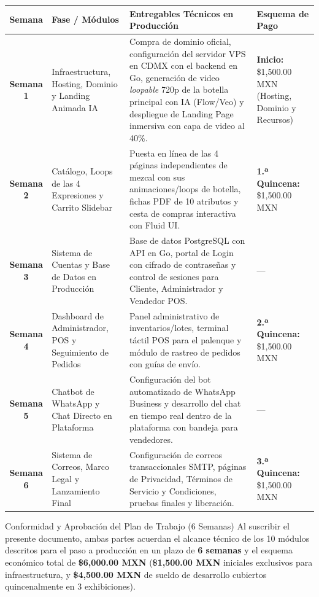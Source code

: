 \documentclass[11pt,letterpaper]{article}
\begin{document}
\begin{table}[H]
\centering
\small
\begin{tabularx}{\textwidth}{cp{4.4cm}Xp{3.0cm}}
\toprule
\rowcolor{MezcalAgave!15}
\textbf{Semana} & \textbf{Fase / Módulos} & \textbf{Entregables Técnicos en Producción} & \textbf{Esquema de Pago} \\
\midrule
\textbf{Semana 1} & Infraestructura, Hosting, Dominio y Landing Animada IA & Compra de dominio oficial, configuración del servidor VPS en CDMX con el backend en Go, generación de video \textit{loopable} 720p de la botella principal con IA (Flow/Veo) y despliegue de Landing Page inmersiva con capa de video al 40\%. & \textbf{Inicio:} \$1,500.00 MXN (Hosting, Dominio y Recursos) \\
\midrule
\textbf{Semana 2} & Catálogo, Loops de las 4 Expresiones y Carrito Slidebar & Puesta en línea de las 4 páginas independientes de mezcal con sus animaciones/loops de botella, fichas PDF de 10 atributos y cesta de compras interactiva con Fluid UI. & \textbf{1.ª Quincena:} \$1,500.00 MXN \\
\midrule
\textbf{Semana 3} & Sistema de Cuentas y Base de Datos en Producción & Base de datos PostgreSQL con API en Go, portal de Login con cifrado de contraseñas y control de sesiones para Cliente, Administrador y Vendedor POS. & --- \\
\midrule
\textbf{Semana 4} & Dashboard de Administrador, POS y Seguimiento de Pedidos & Panel administrativo de inventarios/lotes, terminal táctil POS para el palenque y módulo de rastreo de pedidos con guías de envío. & \textbf{2.ª Quincena:} \$1,500.00 MXN \\
\midrule
\textbf{Semana 5} & Chatbot de WhatsApp y Chat Directo en Plataforma & Configuración del bot automatizado de WhatsApp Business y desarrollo del chat en tiempo real dentro de la plataforma con bandeja para vendedores. & --- \\
\midrule
\textbf{Semana 6} & Sistema de Correos, Marco Legal y Lanzamiento Final & Configuración de correos transaccionales SMTP, páginas de Privacidad, Términos de Servicio y Condiciones, pruebas finales y liberación. & \textbf{3.ª Quincena:} \$1,500.00 MXN \\
\bottomrule
\end{tabularx}
\end{table}

\vspace{0.2cm}
\begin{goldbox}{Conformidad y Aprobación del Plan de Trabajo (6 Semanas)}
Al suscribir el presente documento, ambas partes acuerdan el alcance técnico de los 10 módulos descritos para el paso a producción en un plazo de \textbf{6 semanas} y el esquema económico total de \textbf{\$6,000.00 MXN} (\textbf{\$1,500.00 MXN} iniciales exclusivos para infraestructura, y \textbf{\$4,500.00 MXN} de sueldo de desarrollo cubiertos quincenalmente en 3 exhibiciones).
\end{goldbox}
\end{document}
